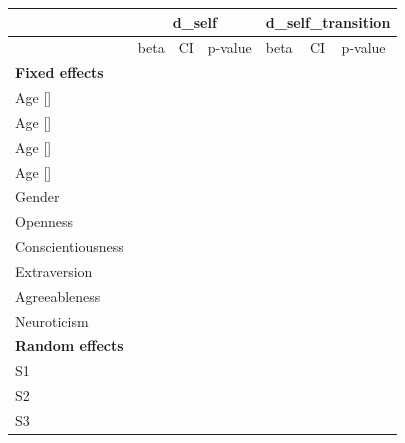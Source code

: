 \documentclass[pdflatex,sn-vancouver,Numbered]{bst/sn-jnl}%
\theoremstyle{thmstyleone}%
\theoremstyle{thmstyletwo}%
\theoremstyle{thmstylethree}%
\begin{document}
\begin{table}[]
\begin{tabular}{@{}lllllll@{}}
\toprule
                  & \multicolumn{3}{c}{d\_self} & \multicolumn{3}{l}{d\_self\_transition} \\ \midrule
                  & beta    & CI    & p-value   & beta        & CI        & p-value       \\
\textbf{Fixed effects}     &         &       &           &             &           &               \\    
Age {[}{]}        &         &       &           &             &           &               \\
Age {[}{]}        &         &       &           &             &           &               \\
Age {[}{]}        &         &       &           &             &           &               \\
Age {[}{]}        &         &       &           &             &           &               \\
Gender            &         &       &           &             &           &               \\
Openness          &         &       &           &             &           &               \\
Conscientiousness &         &       &           &             &           &               \\
Extraversion      &         &       &           &             &           &               \\
Agreeableness     &         &       &           &             &           &               \\
Neuroticism       &         &       &           &             &           &               \\
\textbf{Random effects}    &         &       &           &             &           &               \\
S1                &         &       &           &             &           &               \\
S2                &         &       &           &             &           &               \\
S3                &         &       &           &             &           &               \\ \bottomrule
\end{tabular}
\end{table}
\end{document}
